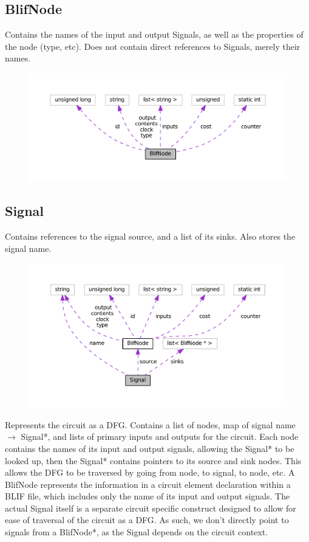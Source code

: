 \documentclass[12pt,final,oneside]{article} %
\begin{document}
   \subsection{BlifNode}
      Contains the names of the input and output Signals, as well as the properties of the node (type, etc).
      Does not contain direct references to Signals, merely their names.
      \begin{figure}
         \includegraphics{doxygen/classBlifNode__coll__graph.pdf}
      \end{figure}

   \subsection{Signal}
      Contains references to the signal source, and a list of its sinks. Also stores the signal name.
      \begin{figure}
         \includegraphics{doxygen/classSignal__coll__graph.pdf}
      \end{figure}


      Represents the circuit as a DFG. Contains a list of nodes, map of signal name $\to$ Signal*, and lists of primary inputs and outputs for the circuit.
      Each node contains the names of its input and output signals, allowing the Signal* to be looked up, then the Signal* contains pointers to its source and sink nodes.
      This allows the DFG to be traversed by going from node, to signal, to node, etc.
      A BlifNode represents the information in a circuit element declaration within a \ac{BLIF} file, which includes only the name of its input and output signals. The actual Signal itself is a separate circuit specific construct designed to allow for ease of traversal of the circuit as a \ac{DFG}.
      As such, we don't directly point to signals from a BlifNode*, as the Signal depends on the circuit context.
\end{document}
